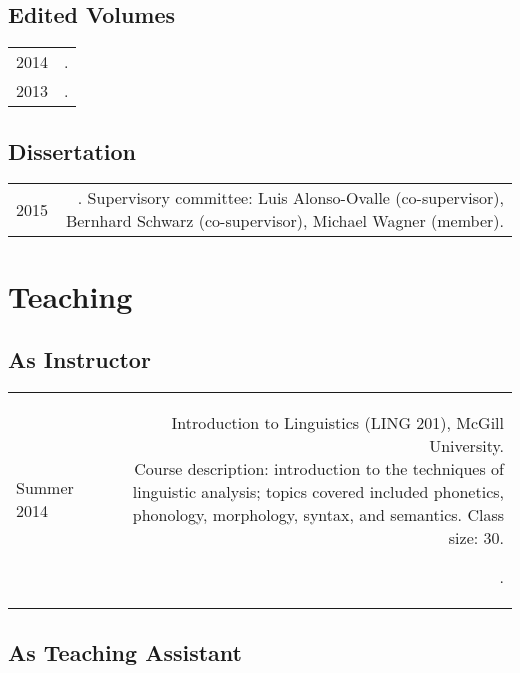 \documentclass[11pt,a4paper,twoside]{article}
\makeatletter
\newcommand{\bodywidth}{0.78}
\newenvironment{cvsection}{%
  \setlength{\extrarowheight}{0.70ex}
  \begin{longtable}[l]{@{} L R @{}}
}{%
  \end{longtable}
}
\newcommand{\course}[3]{%
  \parbox[t]{\bodywidth\textwidth}{#1.\\ {\footnotesize Course description: #2.
      Class size: #3.}}
}
\makeatother
\begin{document}
\subsection*{Edited Volumes}

\begin{cvsection}
  2014 & .\\
  2013 & .\\
\end{cvsection}

\subsection*{Dissertation}

\begin{cvsection}
  2015 & . Supervisory committee: Luis Alonso-Ovalle (co-supervisor), Bernhard Schwarz (co-supervisor), Michael Wagner (member).\\
\end{cvsection}

\section*{Teaching}

\subsection*{As Instructor}

\begin{cvsection}
  Summer 2014 & \course{Introduction to Linguistics (LING 201), McGill University}
  {introduction to the techniques of linguistic analysis; topics covered included phonetics, phonology, morphology, syntax, and semantics}
  {30}.
\end{cvsection}

\subsection*{As Teaching Assistant}
\end{document}
